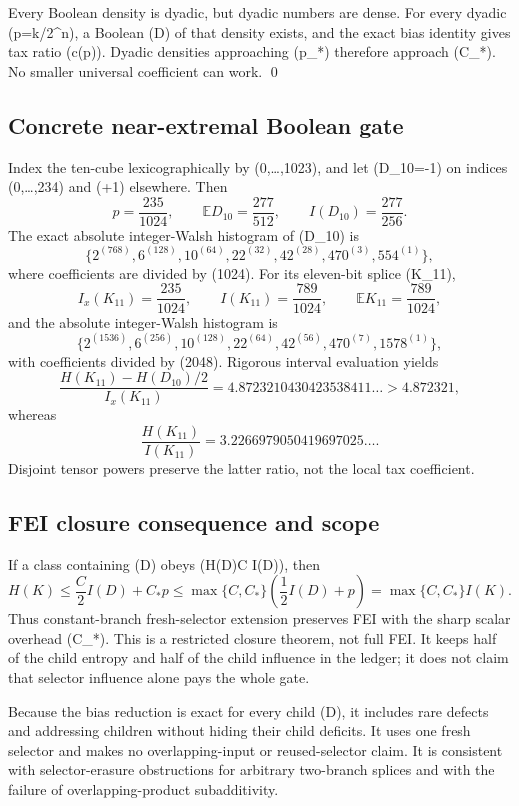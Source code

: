 Every Boolean density is dyadic, but dyadic numbers are dense.  For every
dyadic (p=k/2^n), a Boolean (D) of that density exists, and the exact bias
identity gives tax ratio (c(p)).  Dyadic densities approaching (p_*)
therefore approach (C_*).  No smaller universal coefficient can work.
\qed

\subsection*{Concrete near-extremal Boolean gate}

Index the ten-cube lexicographically by (0,\ldots,1023), and let
(D_{10}=-1) on indices (0,\ldots,234) and (+1) elsewhere.  Then
\[
 p=\frac{235}{1024},\qquad
 \mathbb ED_{10}=\frac{277}{512},\qquad
 I(D_{10})=\frac{277}{256}.
\]
The exact absolute integer-Walsh histogram of (D_{10}) is
\[
 \{2^{(768)},6^{(128)},10^{(64)},22^{(32)},42^{(28)},
 470^{(3)},554^{(1)}\},
\]
where coefficients are divided by (1024).  For its eleven-bit splice
(K_{11}),
\[
 I_x(K_{11})=\frac{235}{1024},\qquad
 I(K_{11})=\frac{789}{1024},\qquad
 \mathbb EK_{11}=\frac{789}{1024},
\]
and the absolute integer-Walsh histogram is
\[
 \{2^{(1536)},6^{(256)},10^{(128)},22^{(64)},42^{(56)},
 470^{(7)},1578^{(1)}\},
\]
with coefficients divided by (2048).  Rigorous interval evaluation yields
\[
 \frac{H(K_{11})-H(D_{10})/2}{I_x(K_{11})}
 =4.8723210430423538411\ldots>4.872321,
\]
whereas
\[
 \frac{H(K_{11})}{I(K_{11})}
 =3.2266979050419697025\ldots.
\]
Disjoint tensor powers preserve the latter ratio, not the local tax
coefficient.

\subsection*{FEI closure consequence and scope}

If a class containing (D) obeys (H(D)\leq C I(D)), then
\[
 H(K)\leq\frac C2 I(D)+C_*p
 \leq\max\{C,C_*\}\left(\frac12I(D)+p\right)
 =\max\{C,C_*\}I(K).
\]
Thus constant-branch fresh-selector extension preserves FEI with the sharp
scalar overhead (C_*).  This is a restricted closure theorem, not full FEI.
It keeps half of the child entropy and half of the child influence in the
ledger; it does not claim that selector influence alone pays the whole gate.

Because the bias reduction is exact for every child (D), it includes rare
defects and addressing children without hiding their child deficits.  It uses
one fresh selector and makes no overlapping-input or reused-selector claim.
It is consistent with selector-erasure obstructions for arbitrary two-branch
splices and with the failure of overlapping-product subadditivity.

